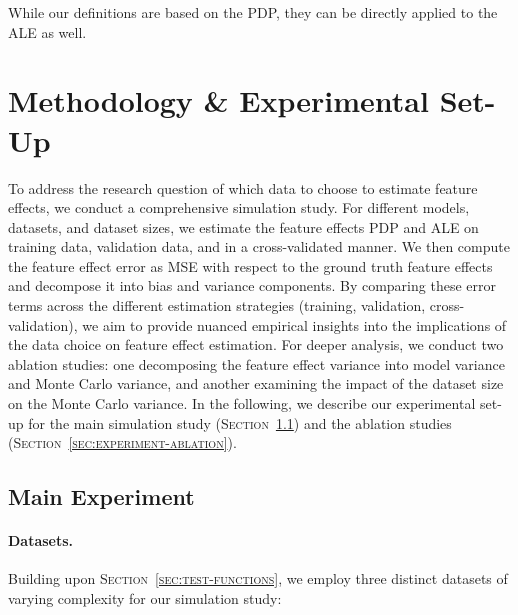 \documentclass[runningheads]{llncs}
\begin{document}
While our definitions are based on the PDP, they can be directly applied to the
ALE as well.

\section{Methodology \& Experimental Set-Up}\label{sec:methodology-set-up}

To address the research question of which data to choose to estimate feature
effects, we conduct a comprehensive simulation study. For different models,
datasets, and dataset sizes, we estimate the feature effects PDP and ALE on
training data, validation data, and in a cross-validated manner. We then
compute the feature effect error as MSE with respect to the ground truth
feature effects and decompose it into bias and variance components. By
comparing these error terms across the different estimation strategies
(training, validation, cross-validation), we aim to provide nuanced empirical
insights into the implications of the data choice on feature effect estimation.
For deeper analysis, we conduct two ablation studies: one decomposing the
feature effect variance into model variance and Monte Carlo variance, and
another examining the impact of the dataset size on the Monte Carlo variance.
In the following, we describe our experimental set-up for the main simulation
study (\textsc{Section~\ref{sec:experiment-main}}) and the ablation studies
(\textsc{Section~\ref{sec:experiment-ablation}}).

\subsection{Main Experiment}\label{sec:experiment-main}

\paragraph{Datasets.}
Building upon \textsc{Section~\ref{sec:test-functions}}, we employ three
distinct datasets of varying complexity for our simulation study:
\end{document}
